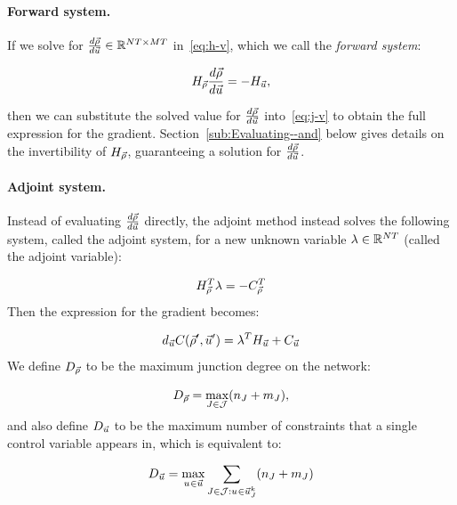 \paragraph{Forward system.\label{par:Forward-system}}

If we solve for $\frac{d\vec{\rho}}{d\vec{u}}\in\mathbb{R}^{NT\times MT}$
in~\eqref{eq:h-v}, which we call the \emph{forward system}:

\[
	H_{\vec{\rho}}\frac{d\vec{\rho}}{d\vec{u}}=-H_{\vec{u}},
\]


then we can substitute the solved value for $\frac{d\vec{\rho}}{d\vec{u}}$
into~\eqref{eq:j-v} to obtain the full expression for the gradient.
Section~\ref{sub:Evaluating--and} below gives details on the invertibility
of $H_{\vec{\rho}}$, guaranteeing a solution for $\frac{d\vec{\rho}}{d\vec{u}}$.


\paragraph{Adjoint system.\label{par:Adjoint-system}}

Instead of evaluating $\frac{d\vec{\rho}}{d\vec{u}}$ directly, the adjoint
method instead solves the following system, called the adjoint system,
for a new unknown variable $\lambda\in\mathbb{R}^{NT}$
(called the adjoint variable):

\begin{equation}
	H_{\vec{\rho}}^{T}\lambda=-C_{\vec{\rho}}^{T}\label{eq:adjoint}
\end{equation}
Then the expression for the gradient becomes:

\begin{equation}
	d_{\control}\cost\left(\nominal{\state},\nominal{\control}\right)=\lambda^{T}\Hu+\Ju\label{eq:adjoint-grad}
\end{equation}
We define $D_{\vec{\rho}}$ to be the maximum junction degree on
the network:

\begin{equation}
	\degree{\state}=\max_{\jn\in\jns}\left(\ninc_{\jn}+\nout_{\jn}\right),\label{eq:dx}
\end{equation}
and also define $D_{\vec{u}}$ to be the maximum number of constraints
that a single control variable appears in, which is equivalent to:

\begin{equation}
	\degree{\control}=\max_{\condiscrete{}{}\in\control}\sum_{\jn\in\jns:\condiscrete{}{}\in\junccon{\jn}{\tind}}\left(\ninc_{\jn}+\nout_{\jn}\right)\label{eq:dv}
\end{equation}


